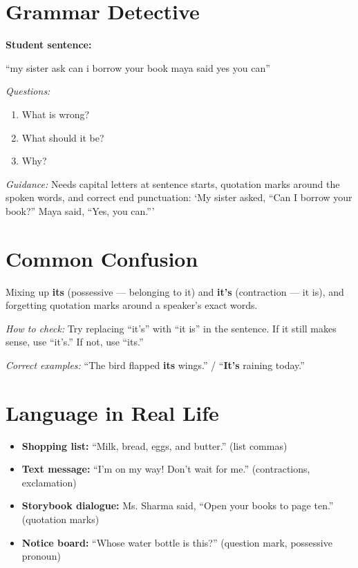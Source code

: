 \section{Grammar Detective}
\begin{detectivebox}
\textbf{Student sentence:}

``my sister ask can i borrow your book maya said yes you can''

\textit{Questions:}
\begin{enumerate}
    \item What is wrong?
    \item What should it be?
    \item Why?
\end{enumerate}

\textit{Guidance:} Needs capital letters at sentence starts, quotation marks around the spoken words, and correct end punctuation: `My sister asked, ``Can I borrow your book?'' Maya said, ``Yes, you can.'''
\end{detectivebox}

\section{Common Confusion}
\begin{warningbox}
Mixing up \textbf{its} (possessive --- belonging to it) and \textbf{it's} (contraction --- it is), and forgetting quotation marks around a speaker's exact words.

\textit{How to check:} Try replacing ``it's'' with ``it is'' in the sentence. If it still makes sense, use ``it's.'' If not, use ``its.''

\textit{Correct examples:} ``The bird flapped \textbf{its} wings.'' / ``\textbf{It's} raining today.''
\end{warningbox}

\section{Language in Real Life}
\begin{itemize}
    \item \textbf{Shopping list:} ``Milk, bread, eggs, and butter.'' (list commas)
    \item \textbf{Text message:} ``I'm on my way! Don't wait for me.'' (contractions, exclamation)
    \item \textbf{Storybook dialogue:} Ms. Sharma said, ``Open your books to page ten.'' (quotation marks)
    \item \textbf{Notice board:} ``Whose water bottle is this?'' (question mark, possessive pronoun)
\end{itemize}

